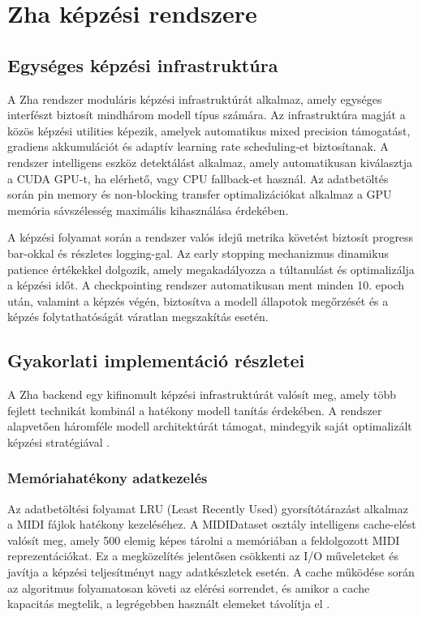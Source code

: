 \section{Zha képzési rendszere}

\subsection{Egységes képzési infrastruktúra}
A Zha rendszer moduláris képzési infrastruktúrát alkalmaz, amely egységes interfészt biztosít mindhárom modell típus számára. Az infrastruktúra magját a közös képzési utilities képezik, amelyek automatikus mixed precision támogatást, gradiens akkumulációt és adaptív learning rate scheduling-et biztosítanak. A rendszer intelligens eszköz detektálást alkalmaz, amely automatikusan kiválasztja a CUDA GPU-t, ha elérhető, vagy CPU fallback-et használ. Az adatbetöltés során pin memory és non-blocking transfer optimalizációkat alkalmaz a GPU memória sávszélesség maximális kihasználása érdekében.

A képzési folyamat során a rendszer valós idejű metrika követést biztosít progress bar-okkal és részletes logging-gal. Az early stopping mechanizmus dinamikus patience értékekkel dolgozik, amely megakadályozza a túltanulást és optimalizálja a képzési időt. A checkpointing rendszer automatikusan ment minden 10. epoch után, valamint a képzés végén, biztosítva a modell állapotok megőrzését és a képzés folytathatóságát váratlan megszakítás esetén.

\subsection{Gyakorlati implementáció részletei}
A Zha backend egy kifinomult képzési infrastruktúrát valósít meg, amely több fejlett technikát kombinál a hatékony modell tanítás érdekében. A rendszer alapvetően háromféle modell architektúrát támogat, mindegyik saját optimalizált képzési stratégiával \cite{zhang2020deep}.

\subsubsection{Memóriahatékony adatkezelés}
Az adatbetöltési folyamat LRU (Least Recently Used) gyorsítótárazást alkalmaz a MIDI fájlok hatékony kezeléséhez. A MIDIDataset osztály intelligens cache-elést valósít meg, amely 500 elemig képes tárolni a memóriában a feldolgozott MIDI reprezentációkat. Ez a megközelítés jelentősen csökkenti az I/O műveleteket és javítja a képzési teljesítményt nagy adatkészletek esetén. A cache működése során az algoritmus folyamatosan követi az elérési sorrendet, és amikor a cache kapacitás megtelik, a legrégebben használt elemeket távolítja el \cite{briot2017deep}.

